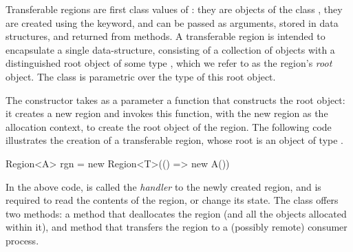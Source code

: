 Transferable regions are first class values of \name: they are objects
of the class , they are created using the  keyword,
and can be passed as arguments, stored in data structures, and
returned from methods.  A transferable region is intended to
encapsulate a single data-structure, consisting of a collection of
objects with a distinguished root object of some type , which we
refer to as the region's \emph{root} object.  The class  is
parametric over the type  of this root object.

The  constructor takes as a parameter a function that
constructs the root object: it creates a new region and invokes this
function, with the new region as the allocation context, to create the
root object of the region. The following code illustrates the
creation of a transferable region, whose root is an object of type
.
\begin{codejava} 
  Region<A> rgn = new Region<T>(() => new A())
\end{codejava} 
In the above code,  is called the \emph{handler} to the newly
created region, and is required to read the contents of the region, or
change its state. The class  offers two methods: a 
method that deallocates the region (and all the objects allocated
within it), and  method that transfers the region to a
(possibly remote) consumer process. 



